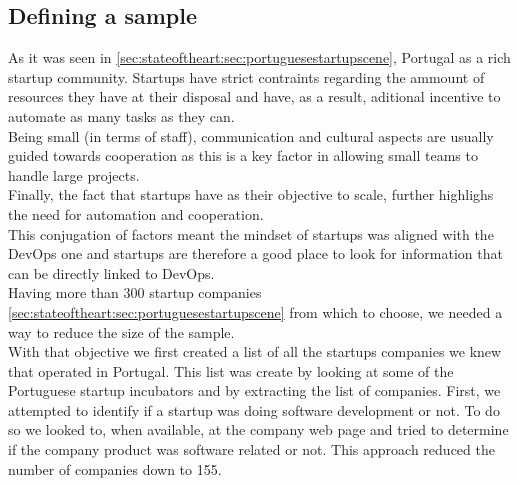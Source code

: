      \subsection{Defining a sample} \label{chap:towardsdevops:sec:methodology:sec:sample}
      As it was seen in \ref{sec:stateoftheart:sec:portuguesestartupscene}, Portugal as a rich startup community. Startups have strict contraints regarding the ammount of resources they have at their disposal and have, as a result, aditional incentive to automate as many tasks as they can. \\
      Being small (in terms of staff), communication and cultural aspects are usually guided towards cooperation as this is a key factor in allowing small teams to handle large projects. \\
      Finally, the fact that startups have as their objective to scale, further highlighs the need for automation and cooperation.\\
      This conjugation of factors meant the mindset of startups was aligned with the DevOps one and startups are therefore a good place to look for information that can be directly linked to DevOps.\\
      Having more than 300 startup companies \ref{sec:stateoftheart:sec:portuguesestartupscene} from which to choose, we needed a way to reduce the size of the sample. \\
      With that objective we first created a list of all the startups companies we knew that operated in Portugal. This list was create by looking at some of the Portuguese startup incubators and by extracting the list of companies.
      First, we attempted to identify if a startup was doing software development or not. To do so we looked to, when available, at the company web page and tried to determine if the company product was software related or not. This approach reduced the number of companies down to 155.

